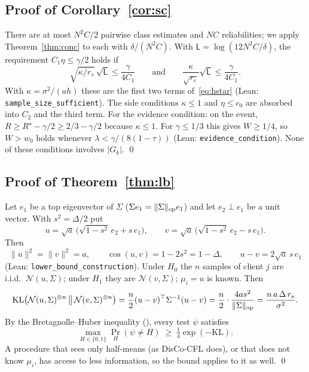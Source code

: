 \subsection{Proof of Corollary~\ref{cor:sc}}
There are at most $N^2C/2$ pairwise class estimates and $NC$ reliabilities; we apply Theorem~\ref{thm:conc} to each with $\delta/(N^2C)$. With $\mathsf L=\log(12N^2C/\delta)$, the requirement $C_1\eta\le\gamma/2$ holds if
\[
\sqrt{\kappa/r_s}\,\sqrt{\mathsf L}\le\frac{\gamma}{4C_1}
\qquad\text{and}\qquad
\frac{\kappa}{\sqrt{r_e}}\sqrt{\mathsf L}\le\frac{\gamma}{4C_1}.
\]
With $\kappa=\sigma^2/(ah)$ these are the first two terms of~\eqref{eq:hstar} (Lean: \texttt{sample\_size\_sufficient}). The side conditions $\kappa\le1$ and $\eta\le c_0$ are absorbed into $C_2$ and the third term. For the evidence condition: on the event, $R\ge R^\star-\gamma/2\ge2/3-\gamma/2$ because $\kappa\le1$. For $\gamma\le1/3$ this gives $W\ge1/4$, so $W>w_0$ holds whenever $\lambda<\gamma/(8(1-\tau))$ (Lean: \texttt{evidence\_condition}). None of these conditions involves $|G_k|$. \qed

\subsection{Proof of Theorem~\ref{thm:lb}}
Let $e_1$ be a top eigenvector of $\Sigma$ ($\Sigma e_1=\|\Sigma\|_{\mathrm{op}} e_1$) and let $e_2\perp e_1$ be a unit vector. With $s^2=\Delta/2$ put
\[
u=\sqrt a\,\big(\sqrt{1-s^2}\,e_2+s\,e_1\big),
\qquad
v=\sqrt a\,\big(\sqrt{1-s^2}\,e_2-s\,e_1\big).
\]
Then
\[
\|u\|^2=\|v\|^2=a,\qquad \cos(u,v)=1-2s^2=1-\Delta,\qquad u-v=2\sqrt a\,s\,e_1
\]
(Lean: \texttt{lower\_bound\_construction}). Under $H_0$ the $n$ samples of client $j$ are i.i.d.\ $\mathcal N(u,\Sigma)$; under $H_1$ they are $\mathcal N(v,\Sigma)$; $\mu_i=u$ is known. Then
\[
\mathrm{KL}\big(\mathcal N(u,\Sigma)^{\otimes n}\,\big\|\,\mathcal N(v,\Sigma)^{\otimes n}\big)
=\frac n2(u-v)^\top\Sigma^{-1}(u-v)
=\frac n2\cdot\frac{4as^2}{\|\Sigma\|_{\mathrm{op}}}
=\frac{n\,a\,\Delta\,r_s}{\sigma^2}.
\]
By the Bretagnolle--Huber inequality (\citealp[Thm.~2.2]{tsybakov2009}), every test $\psi$ satisfies
\[
\max_{H\in\{0,1\}}\Pr_H(\psi\neq H)\;\ge\;\tfrac14\exp(-\mathrm{KL}).
\]
A procedure that sees only half-means (as DisCo-CFL does), or that does not know $\mu_i$, has access to less information, so the bound applies to it as well. \qed

